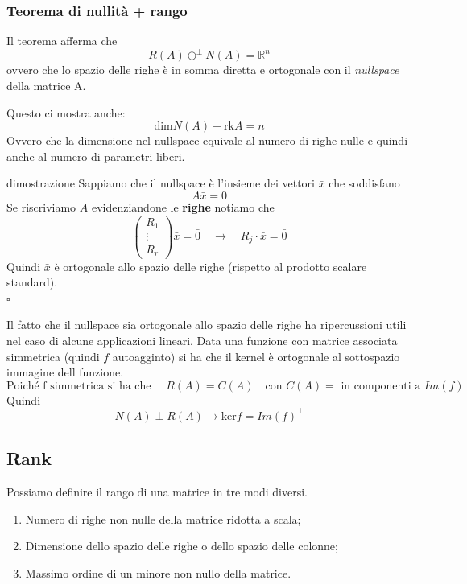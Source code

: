 \documentclass[x11names]{article}
\newcommand*{\QEDB}{\null\nobreak\hfill\ensuremath{\square}}%
\begin{document}
\begin{center}
	\colorbox{myred}{\begin{minipage}{5.75in}
			\begin{redes}{}
								\subsubsection{Teorema di nullità + rango}
				Il teorema afferma che
				\[
				R(A) \oplus^\perp N(A) = \mathbb{R}^n
				\]
				ovvero che lo spazio delle righe è in somma diretta e ortogonale con il \textit{nullspace} della matrice A.
				
				Questo ci mostra anche:
				\[
				\text{dim}N(A) + \text{rk}A = n
				\]
				Ovvero che la dimensione nel nullspace equivale al numero di righe nulle e quindi anche al numero di parametri liberi.
				
			\end{redes}
	\end{minipage}}        
\end{center}

\begin{es}{dimostrazione}
	Sappiamo che il nullspace è l'insieme dei vettori $\bar{x}$ che soddisfano
	\[
	A\bar{x} = 0
	\]
	Se riscriviamo $A$ evidenziandone le \textbf{righe} notiamo che
	\[
	\left(\begin{array}{c}
		R_{1} \\
		\vdots \\
		R_{r}
	\end{array}\right)\bar{x} = \bar{0}
	\quad \to \quad R_{j} \cdot \bar{x} = \bar{0} 
	\]
	Quindi $\bar{x}$ è ortogonale allo spazio delle righe (rispetto al prodotto scalare standard).
	\\
	\QEDB
\end{es}


\noindent
Il fatto che il nullspace sia ortogonale allo spazio delle righe ha ripercussioni utili nel caso di alcune applicazioni lineari. Data una funzione con matrice associata simmetrica (quindi $f$ autoagginto) si ha che il kernel è ortogonale al sottospazio immagine dell funzione.
\[
\text{Poiché f simmetrica si ha che } \quad R(A) = C(A) \quad \text{con } C(A) = \text{ in componenti a } Im(f) 
\]
Quindi
\[
N(A) \perp R(A) \to \text{ker}f = Im(f)^\perp
\]

\subsection{Rank}
Possiamo definire il rango di una matrice in tre modi diversi.
\begin{enumerate}
	\item Numero di righe non nulle della matrice ridotta a scala;
	\item Dimensione dello spazio delle righe o dello spazio delle colonne;
	\item Massimo ordine di un minore non nullo della matrice.
\end{enumerate}
\end{document}
